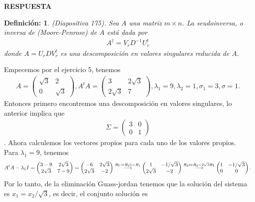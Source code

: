 \documentclass[11pt,letterpaper]{article}
\newcommand{\res}{\textbf{RESPUESTA}\\}
\newcommand{\grstep}[2][\relax]{%
   \ensuremath{\mathrel{
       {\mathop{\longrightarrow}\limits^{#2\mathstrut}_{
                                     \begin{subarray}{l} #1 \end{subarray}}}}}}
\newtheorem{thmd}{Definición:}
\begin{document}
\begin{enumerate}
\res \begin{framed}
    \begin{thmd} \label{d_seudoinversa}
	(Diapositiva 175). Sea $A$ una matriz $m\times n$. La seudoinversa, o inversa de (Moore-Penrose) de $A$ está dada por 
	\begin{align*}
	A^\dagger = V_rD^{-1} U_r^t
	\end{align*}
	donde $A=U_r D V_r^t$ es una descomposición en valores singulares reducida de $A$. 
	    \end{thmd}
\end{framed}
Empecemos por el ejercicio 5, tenemos 
\begin{align*}
A=\begin{pmatrix}
\sqrt{3} & 2\\
0 & \sqrt{3}
\end{pmatrix}, A^tA=\begin{pmatrix}
3 & 2 \sqrt{3} \\
2\sqrt{3} &7
\end{pmatrix}, \lambda_1=9, \lambda_2=1, \sigma_1 =3, \sigma=1.
\end{align*}
Entonces primero encontremos una descomposición en valores singulares, lo anterior implica que 
\begin{align*}
\Sigma = \begin{pmatrix}
3 & 0 \\
0 & 1
\end{pmatrix}
\end{align*}.
Ahora calculemos los vectores propios para cada uno de los valores propios. Para $\lambda_1=9$, tenemos 
\begin{align*}
A^tA-\lambda_1I=\begin{pmatrix}
3-9 & 2 \sqrt{3} \\
2\sqrt{3} &7-9
\end{pmatrix}=\begin{pmatrix}
-6 & 2 \sqrt{3} \\
2\sqrt{3} &-2
\end{pmatrix}
\grstep[]{R_1 \Rightarrow R_21-R_1}
%
\begin{pmatrix}
1 & -1/\sqrt{3} \\
2\sqrt{3} &-2
\end{pmatrix}
%
\grstep[]{R_2 \leftrightarrow R_2-2\sqrt{3}R_1}
%
\begin{pmatrix}
1 & -1/\sqrt{3} \\
0 &0
\end{pmatrix}.
\end{align*}
Por lo tanto, de la eliminación Guass-jordan tenemos que la solución del sistema es $x_1=x_2/\sqrt{3}$, es decir, el conjunto solución es

\end{enumerate}
\end{document}
